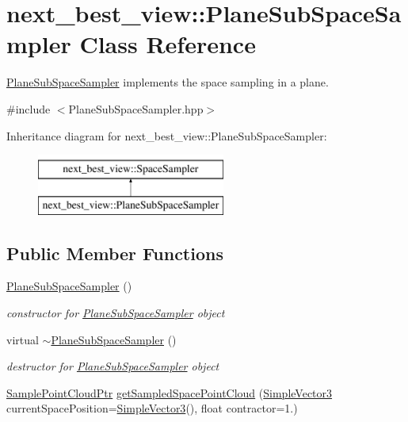 \hypertarget{classnext__best__view_1_1PlaneSubSpaceSampler}{\section{next\-\_\-best\-\_\-view\-:\-:\-Plane\-Sub\-Space\-Sampler \-Class \-Reference}
\label{classnext__best__view_1_1PlaneSubSpaceSampler}
}


\hyperlink{classnext__best__view_1_1PlaneSubSpaceSampler}{\-Plane\-Sub\-Space\-Sampler} implements the space sampling in a plane.  




{\ttfamily \#include $<$\-Plane\-Sub\-Space\-Sampler.\-hpp$>$}

\-Inheritance diagram for next\-\_\-best\-\_\-view\-:\-:\-Plane\-Sub\-Space\-Sampler\-:\begin{figure}[H]
\begin{center}
\leavevmode
\includegraphics[height=2.000000cm]{classnext__best__view_1_1PlaneSubSpaceSampler}
\end{center}
\end{figure}
\subsection*{\-Public \-Member \-Functions}
\begin{DoxyCompactItemize}
\item 
\hyperlink{classnext__best__view_1_1PlaneSubSpaceSampler_aef0a174710433c85567da5803a8d19ec}{\-Plane\-Sub\-Space\-Sampler} ()
\begin{DoxyCompactList}\small\item\em constructor for \hyperlink{classnext__best__view_1_1PlaneSubSpaceSampler}{\-Plane\-Sub\-Space\-Sampler} object \end{DoxyCompactList}\item 
virtual \hyperlink{classnext__best__view_1_1PlaneSubSpaceSampler_a08785bb5ce256b40851ac1b1ada990d8}{$\sim$\-Plane\-Sub\-Space\-Sampler} ()
\begin{DoxyCompactList}\small\item\em destructor for \hyperlink{classnext__best__view_1_1PlaneSubSpaceSampler}{\-Plane\-Sub\-Space\-Sampler} object \end{DoxyCompactList}\item 
\hyperlink{namespacenext__best__view_a6351e8a1adb34a715016b1768ad51120}{\-Sample\-Point\-Cloud\-Ptr} \hyperlink{classnext__best__view_1_1PlaneSubSpaceSampler_ad0ec12391d12b52599a1f59b185200ce}{get\-Sampled\-Space\-Point\-Cloud} (\hyperlink{namespacenext__best__view_a59fc75b908e198bc02a9b19ba88edf12}{\-Simple\-Vector3} current\-Space\-Position=\hyperlink{namespacenext__best__view_a59fc75b908e198bc02a9b19ba88edf12}{\-Simple\-Vector3}(), float contractor=1.)
\end{DoxyCompactItemize}



